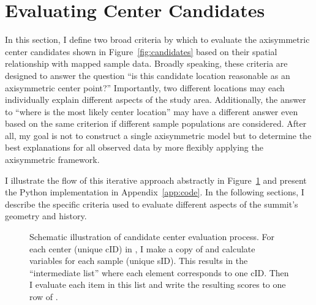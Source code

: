 \section{Evaluating Center Candidates}\label{sec:evaluation}


In this section, I define two broad criteria by which to evaluate the axisymmetric center candidates shown in Figure~\ref{fig:candidates} based on their spatial relationship with mapped sample data. Broadly speaking, these criteria are designed to answer the question ``is this candidate location reasonable as an axisymmetric center point?'' Importantly, two different locations may each individually explain different aspects of the study area. Additionally, the answer to ``where is the most likely center location'' may have a different answer even based on the same criterion if different sample populations are considered. After all, my goal is not to construct a single axisymmetric model but to determine the best explanations for all observed data by more flexibly applying the axisymmetric framework.

I illustrate the flow of this iterative approach abstractly in Figure~\ref{fig:eval-model} and present the Python implementation in Appendix~\ref{app:code}. In the following sections, I describe the specific criteria used to evaluate different aspects of the summit's geometry and history.

\begin{figure}
    \caption[Center evaluation workflow]{Schematic illustration of candidate center evaluation process. For each center (unique cID) in , I make a copy of  and calculate variables for each sample (unique sID). This results in the ``intermediate list'' where each element corresponds to one cID. Then I evaluate each item in this list and write the resulting scores to one row of .}%
    \label{fig:eval-model}
\end{figure}

